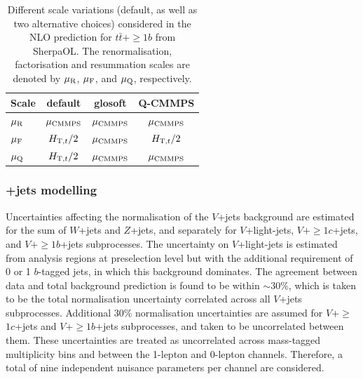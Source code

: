 \begin{table}
\begin{center}
\begin{tabular}{lccc}
\hline\hline
Scale & default & glosoft & Q-CMMPS \\
\hline
$\mu_{\rm R}$ & $\mu_{\rm CMMPS}$ & $\mu_{\rm CMMPS}$ & $\mu_{\rm CMMPS}$ \\
$\mu_{\rm F}$  & $H_{{\rm T}, t}/2$ & $\mu_{\rm CMMPS}$ & $H_{{\rm T}, t}/2$ \\
$\mu_{\rm Q}$  & $H_{{\rm T}, t}/2$ & $\mu_{\rm CMMPS}$ & $\mu_{\rm CMMPS}$ \\
\hline\hline
\end{tabular}
\captionsetup{width=0.85\textwidth} \caption{\small Different scale variations (default, as well as two alternative choices) considered in the NLO prediction for $t\bar{t}+\ge1b$  from {\sc SherpaOL}.
The renormalisation, factorisation and resummation scales are denoted by $\mu_{\rm R}$, $\mu_{\rm F}$, and $\mu_{\rm Q}$, respectively.}
\label{chp:vlq:tab:sherpascales}
\end{center}  
\end{table}


\subsubsection[$V$+jets modelling]{+jets modelling}
Uncertainties affecting the normalisation of the $V$+jets background are estimated for the sum of $W$+jets and $Z$+jets, and separately for $V$+light-jets, $V+\ge1c$+jets, and $V+\ge1b$+jets subprocesses. The uncertainty on $V$+light-jets is estimated from analysis regions at preselection level but with the additional requirement of  0 or 1 $b$-tagged jets, in which this background dominates. The agreement between data and total background prediction is found to be within $\sim30\%$, which is taken to be the total normalisation uncertainty correlated across all $V$+jets subprocesses. Additional $30\%$ normalisation uncertainties are assumed for $V$+$\ge$$1c$+jets and $V$+$\ge$$1b$+jets subprocesses, and taken to be uncorrelated between them. These uncertainties are treated as uncorrelated across mass-tagged multiplicity bins and between the 1-lepton and 0-lepton channels. Therefore, a total of nine independent nuisance parameters per channel are considered.

